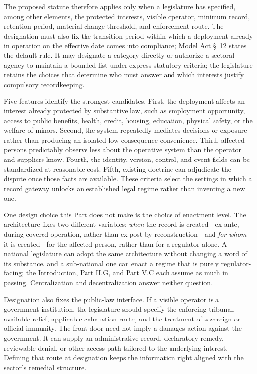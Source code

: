 The proposed statute therefore applies only when a legislature has specified, among other elements, the protected interests, visible operator, minimum record, retention period, material-change threshold, and enforcement route. The designation must also fix the transition period within which a deployment already in operation on the effective date comes into compliance; Model Act \S~12 states the default rule. It may designate a category directly or authorize a sectoral agency to maintain a bounded list under express statutory criteria; the legislature retains the choices that determine who must answer and which interests justify compulsory recordkeeping.

Five features identify the strongest candidates. First, the deployment affects an interest already protected by substantive law, such as employment opportunity, access to public benefits, health, credit, housing, education, physical safety, or the welfare of minors. Second, the system repeatedly mediates decisions or exposure rather than producing an isolated low-consequence convenience. Third, affected persons predictably observe less about the operative system than the operator and suppliers know. Fourth, the identity, version, control, and event fields can be standardized at reasonable cost. Fifth, existing doctrine can adjudicate the dispute once those facts are available. These criteria select the settings in which a record gateway unlocks an established legal regime rather than inventing a new one.

One design choice this Part does not make is the choice of enactment level. The architecture fixes two different variables: \emph{when} the record is created---ex ante, during covered operation, rather than ex post by reconstruction---and \emph{for whom} it is created---for the affected person, rather than for a regulator alone. A national legislature can adopt the same architecture without changing a word of its substance, and a sub-national one can enact a regime that is purely regulator-facing; the Introduction, Part II.G, and Part V.C each assume as much in passing. Centralization and decentralization answer neither question.

Designation also fixes the public-law interface. If a visible operator is a government institution, the legislature should specify the enforcing tribunal, available relief, applicable exhaustion route, and the treatment of sovereign or official immunity. The front door need not imply a damages action against the government. It can supply an administrative record, declaratory remedy, reviewable denial, or other access path tailored to the underlying interest. Defining that route at designation keeps the information right aligned with the sector's remedial structure.


